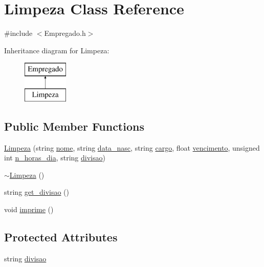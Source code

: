 \hypertarget{class_limpeza}{
\section{Limpeza Class Reference}
\label{class_limpeza}
}


{\ttfamily \#include $<$Empregado.h$>$}

Inheritance diagram for Limpeza:\begin{figure}[H]
\begin{center}
\leavevmode
\includegraphics[height=2.000000cm]{class_limpeza}
\end{center}
\end{figure}
\subsection*{Public Member Functions}
\begin{DoxyCompactItemize}
\item 
\hyperlink{class_limpeza_a4bbeddc92808708d1123e11bf9d9a2eb}{Limpeza} (string \hyperlink{class_empregado_a3ef62ed62672a17b1c7769eb0e954a34}{nome}, string \hyperlink{class_empregado_add428a10de63973303f960cd984e3c41}{data\_\-nasc}, string \hyperlink{class_empregado_a6a3290cc27e7d4c00d430fedd90254c9}{cargo}, float \hyperlink{class_empregado_a7580affd67f7e1c240c8c98cfd11e195}{vencimento}, unsigned int \hyperlink{class_empregado_ab8c2aa44f61f58fb592fc3d8a7466c34}{n\_\-horas\_\-dia}, string \hyperlink{class_limpeza_a729f6463f5ed067d6f5764364527eb54}{divisao})
\item 
\hyperlink{class_limpeza_ac5b6d084c7c718388a8ea8aeafaf94f8}{$\sim$Limpeza} ()
\item 
string \hyperlink{class_limpeza_acabe44c330b8b43e6dd925892950bdff}{get\_\-divisao} ()
\item 
void \hyperlink{class_limpeza_a1bc24c421cd94a03bc2852d9be204c68}{imprime} ()
\end{DoxyCompactItemize}
\subsection*{Protected Attributes}
\begin{DoxyCompactItemize}
\item 
string \hyperlink{class_limpeza_a729f6463f5ed067d6f5764364527eb54}{divisao}
\end{DoxyCompactItemize}


